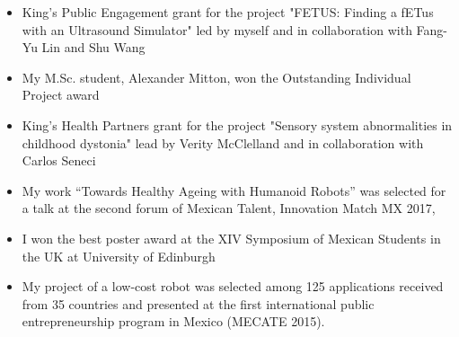 \documentclass{mycv}
\begin{document}
\begin{itemize}
\item King's Public Engagement grant for the project "FETUS: Finding a fETus with an Ultrasound Simulator" led by myself and in collaboration with Fang-Yu Lin and Shu Wang \href{https://cai4cai.ml/post/2021-01-07-miguelpegrant/}{\faExternalLink} 

\item My M.Sc. student, Alexander Mitton, won the Outstanding Individual Project award 
 \href{https://www.kcl.ac.uk/news/mscmres-healthcare-technologies-award-student-prizes-for-outstanding-performance-and-contributions-to-student-life}{\faExternalLink} 

\item King's Health Partners grant for the project "Sensory system abnormalities in childhood dystonia" lead by Verity McClelland and in collaboration with Carlos Seneci \href{https://kclpure.kcl.ac.uk/portal/en/persons/miguel-angel-perez-xochicale(cca72683-31b7-496a-8aeb-181fd9d6a8f3)/projects.html}{\faExternalLink} 

\item My work ``Towards Healthy Ageing with Humanoid Robots'' was selected for a talk at the second forum of Mexican Talent, Innovation Match MX 2017, \href{https://github.com/mxochicale/InnovationMatchMX/tree/master/2017}{\faExternalLink} \href{https://github.com/mxochicale/InnovationMatchMX/blob/master/2017/presentation/IMMX-MA-0058.pdf}{\faFilePdfO} \href{https://www.youtube.com/watch?v=wNWzpdXdm5U}{\faYoutube} 

\item I won the best poster award at the XIV Symposium of Mexican Students in the UK at University of Edinburgh \href{https://github.com/mxochicale/symposiummx/tree/master/2016}{\faExternalLink}  

\item My project of a low-cost robot was selected among 125 applications received from 35 countries and presented at the first international public entrepreneurship program in Mexico (MECATE 2015). \href{http://let-emprendimientopublico.mx/en/portfolio_category/mecate-primera-generacion-en/}{\faExternalLink} \href{https://www.youtube.com/watch?v=VjVGnwD422g}{\faYoutube} 


\end{itemize}
\end{document}
